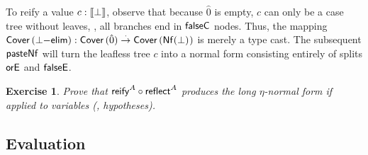 \documentclass[a4paper]{article}
\newtheorem{exercise}[theorem]{Exercise}
\begin{document}
To reify a value $c : \mathopen{{[\kern-0.14em[}} \bot \mathclose{{]\kern-0.14em]}}$, observe that because $\hat0$ is
empty, $c$ can only be a case tree without leaves, \ie, all branches
end in $\mathsf{falseC}$ nodes.  Thus, the mapping
$\mathsf{Cover}\,(\bot\mathsf{-elim}) : \mathsf{Cover}\,(\hat0) \stackrel{\cdot}{\to} \mathsf{Cover}\,(\mathsf{Nf}(\bot)_{})$ is merely a
type cast.  The subsequent $\mathsf{pasteNf}$ will turn the leafless tree $c$
into a normal form consisting entirely of splits $\mathsf{orE}$ and $\mathsf{falseE}$.

\begin{exercise}
Prove that $\mathsf{reify}^{A} \circ \mathsf{reflect}^{A}$ produces the long
$\eta$-normal form if applied to variables (\ie, hypotheses).
\end{exercise}



\subsection{Evaluation}
\end{document}
